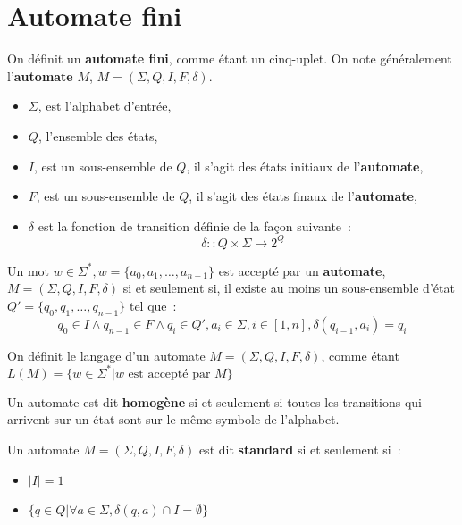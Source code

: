 \section{Automate fini}

\begin{Definition}
  On définit un \textbf{automate fini}, comme étant un cinq-uplet. On note 
  généralement l'\textbf{automate} \(M\), \(M = (\Sigma, Q, I, F, \delta)\).
  \begin{itemize}
    \item \(\Sigma\), est l'alphabet d'entrée,
    \item \(Q\), l'ensemble des états,
    \item \(I\), est un sous-ensemble de \(Q\), il s'agit des états initiaux de 
    l'\textbf{automate},
    \item \(F\), est un sous-ensemble de \(Q\), il s'agit des états finaux de 
    l'\textbf{automate},
    \item \(\delta\) est la fonction de transition définie de la façon 
    suivante~:
    \[
      \delta :: Q \times \Sigma \to 2^Q
    \]
  \end{itemize}
\end{Definition}

\begin{Definition}
  Un mot \(w \in \Sigma^{*}, w = \{a_0, a_1, \dots, a_{n-1}\}\) est accepté par 
  un \textbf{automate}, \(M = (\Sigma, Q, I, F, \delta)\) si et seulement si, 
  il existe au moins un sous-ensemble d'état 
  \(Q' = \{q_0, q_1, \dots, q_{n-1}\}\) tel que~:
  \[
    q_0 \in I \land q_{n-1} \in F \land 
    q_{i} \in Q', a_{i} \in \Sigma, i \in [1, n], 
    \delta(q_{i - 1}, a_{i}) = q_{i}
  \]
\end{Definition}

\begin{Definition}
  On définit le langage d'un automate \(M = (\Sigma, Q, I, F, \delta)\), comme 
  étant \(L(M) = \{w \in \Sigma^* | w \text{ est accepté par } M\}\)
\end{Definition}

\begin{Definition}
  Un automate est dit \textbf{homogène} si et seulement si toutes les 
  transitions qui arrivent sur un état sont sur le même symbole de l'alphabet.
\end{Definition}

\begin{Definition}
  Un automate \(M = (\Sigma, Q, I, F, \delta)\) est dit \textbf{standard} si et 
  seulement si~:
  \begin{itemize}
    \item \(|I| = 1\)
    \item \(\{q \in Q | \forall a \in \Sigma, \delta(q, a) \cap I = \emptyset\}\)
  \end{itemize}
\end{Definition}

